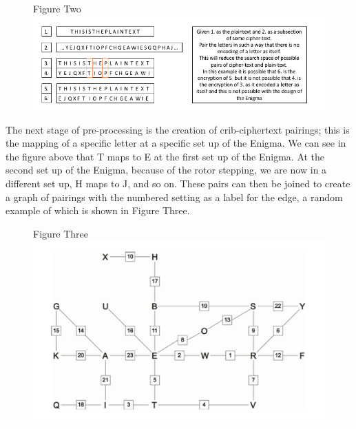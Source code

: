 \documentclass[12pt,a4paper]{article}
\begin{document}
\begin{figure}[H]
\centering
Figure Two
\includegraphics[width=\textwidth]{StageOneBOMBE.png}
\end{figure} 

The next stage of pre-processing is the creation of crib-ciphertext pairings; this is the mapping of a specific letter at a specific set up of the Enigma. We can see in the figure above that T maps to E at the first set up of the Enigma. At the second set up of the Enigma, because of the rotor stepping, we are now in a different set up, H maps to J, and so on. These pairs can then be joined to create a graph of pairings with the numbered setting as a label for the edge, a random example of which is shown in Figure Three.

\begin{figure}[H]
\centering
Figure Three
\includegraphics[width=\textwidth]{StageTwoBOMBE.png}
\end{figure}
\end{document}
